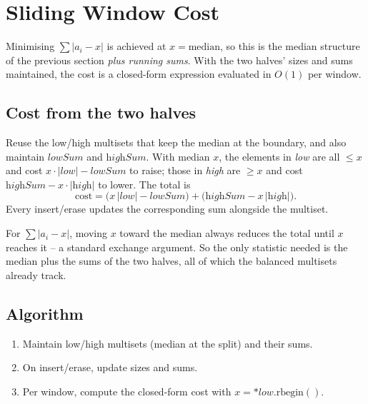 \section{Sliding Window Cost}
\label{sec:cses-sw-cost}


\begin{patternbox}
Minimising $\sum\lvert a_i-x\rvert$ is achieved at $x=\text{median}$, so
this is the median structure of the previous section \emph{plus running
sums}. With the two halves' sizes and sums maintained, the cost is a
closed-form expression evaluated in $O(1)$ per window.
\end{patternbox}

\subsection*{Cost from the two halves}

Reuse the low/high multisets that keep the median at the boundary, and also
maintain $\textit{lowSum}$ and $\textit{highSum}$. With median $x$, the
elements in \textit{low} are all $\le x$ and cost
$x\cdot|\textit{low}|-\textit{lowSum}$ to raise; those in \textit{high} are
$\ge x$ and cost $\textit{highSum}-x\cdot|\textit{high}|$ to lower. The
total is
\[
  \text{cost}=\big(x\,|\textit{low}|-\textit{lowSum}\big)+
  \big(\textit{highSum}-x\,|\textit{high}|\big).
\]
Every insert/erase updates the corresponding sum alongside the multiset.

\begin{ideabox}
For $\sum\lvert a_i-x\rvert$, moving $x$ toward the median always reduces
the total until $x$ reaches it -- a standard exchange argument. So the only
statistic needed is the median plus the sums of the two halves, all of
which the balanced multisets already track.
\end{ideabox}

\subsection*{Algorithm}

\begin{enumerate}
  \item Maintain low/high multisets (median at the split) and their sums.
  \item On insert/erase, update sizes and sums.
  \item Per window, compute the closed-form cost with $x=\ast\textit{low}.
        \text{rbegin}()$.
\end{enumerate}

